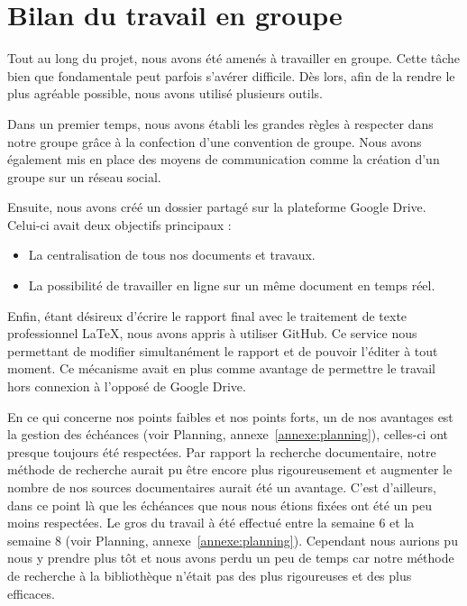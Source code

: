 \section{Bilan du travail en groupe}

Tout au long du projet, nous avons été amenés à travailler en groupe. Cette tâche bien que fondamentale peut parfois s'avérer difficile. Dès lors, afin de la rendre le plus agréable possible, nous avons utilisé plusieurs outils.

Dans un premier temps, nous avons établi les grandes règles à respecter dans notre groupe grâce à la confection d'une convention de groupe. Nous avons également mis en place des moyens de communication comme la création d'un groupe sur un réseau social.

Ensuite, nous avons créé un dossier partagé sur la plateforme Google Drive. Celui-ci avait deux objectifs principaux :
\begin{itemize}
\item La centralisation de tous nos documents et travaux.
\item La possibilité de travailler en ligne sur un même document en temps réel.
\end{itemize}

Enfin, étant désireux d'écrire le rapport final avec le traitement de texte professionnel \LaTeX, nous avons appris à utiliser GitHub. Ce service nous permettant de modifier simultanément le rapport et de pouvoir l'éditer à tout moment. Ce mécanisme avait en plus comme avantage de permettre le travail hors connexion à l'opposé de Google Drive.

En ce qui concerne nos points faibles et nos points forts, un de nos avantages est la gestion des échéances (voir Planning, annexe~\ref{annexe:planning}), celles-ci ont presque toujours été respectées. 
Par rapport la recherche documentaire, notre méthode de recherche aurait pu être encore plus rigoureusement et augmenter le nombre de nos sources documentaires aurait été un avantage. C'est d'ailleurs, dans ce point là que les échéances que nous nous étions fixées ont été un peu moins respectées. Le gros du travail à été effectué entre la semaine 6 et la semaine 8 (voir Planning, annexe~\ref{annexe:planning}). Cependant nous aurions pu nous y prendre plus tôt et nous avons perdu un peu de temps car notre méthode de recherche à la bibliothèque n'était pas des plus rigoureuses et des plus efficaces.


